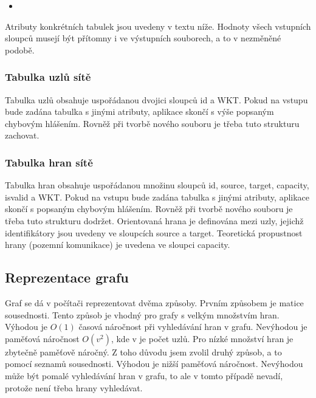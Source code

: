\documentclass[12pt,a4paper]{article}
\begin{document}
	\begin{itemize}
	\item[]
	\end{itemize}
	
	 Atributy konkrétních tabulek jsou uvedeny v textu níže. Hodnoty všech vstupních sloupců musejí být přítomny i ve výstupních souborech, a to v nezměněné podobě.
	 \\[\baselineskip]
	 \subsubsection{Tabulka uzlů sítě}
	 Tabulka uzlů obsahuje uspořádanou dvojici sloupců id a WKT. Pokud na vstupu bude zadána tabulka s jinými atributy, aplikace skončí s výše popsaným chybovým hlášením. Rovněž při tvorbě nového souboru je třeba tuto strukturu zachovat.
	 \\[\baselineskip]
	 \subsubsection{Tabulka hran sítě}
	 Tabulka hran obsahuje uspořádanou množinu sloupců id, source, target, capacity, isvalid a WKT. Pokud na vstupu bude zadána tabulka s jinými atributy, aplikace skončí s popsaným chybovým hlášením. Rovněž při tvorbě nového souboru je třeba tuto strukturu dodržet. Orientovaná hrana je definována mezi uzly, jejichž identifikátory jsou uvedeny ve sloupcích source a target. Teoretická propustnost hrany (pozemní komunikace) je uvedena ve sloupci capacity.

	 
	 \subsection{Reprezentace grafu}
	 Graf se dá v počítači reprezentovat dvěma způsoby. Prvním způsobem je matice sousednosti. Tento způsob je vhodný pro grafy s velkým množstvím hran. Výhodou je $O(1)$ časová náročnost při vyhledávání hran v grafu. Nevýhodou je paměťová náročnost $O(v^2)$, kde v je počet uzlů. Pro nízké množství hran je zbytečně paměťově náročný. Z toho důvodu jsem zvolil druhý způsob, a to pomocí seznamů sousednosti. Výhodou je nižší paměťová náročnost. Nevýhodou může být pomalé vyhledávání hran v grafu, to ale v tomto případě nevadí, protože není třeba hrany vyhledávat.
\end{document}
